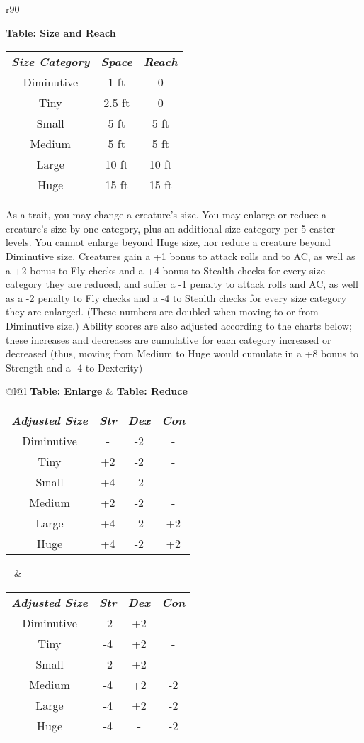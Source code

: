 	{\begin{wraptable}[9]{r}{90\unitlength}
		\raggedright\textbf{Table: Size and Reach}
		\small
		\begin{tabular}{@{}c@{~~~}c@{~~}c}
		\rowcolor{gray!50}
			\textbf{\textit{Size Category}} &\textbf{\textit{Space}}&\textbf{\textit{Reach}}\\
			Diminutive& 1 ft& 0\\
			Tiny &2.5 ft&0\\
			Small &5 ft&5 ft\\
			Medium &5 ft&5 ft\\
			Large &10 ft&10 ft\\
			Huge &15 ft&15 ft
		\end{tabular}
	\end{wraptable}
	As a trait, you may change a creature's size. You may enlarge or reduce a creature's size by one category, plus an additional size category per 5 caster levels. You cannot enlarge beyond Huge size, nor reduce a creature beyond Diminutive size. Creatures gain a +1 bonus to attack rolls and to AC, as well
	as a +2 bonus to Fly checks and a +4 bonus to Stealth checks for every size category they are reduced, and suffer a -1 penalty to attack rolls and AC, as well as a -2 penalty to Fly checks and a -4 to Stealth checks for every size category they are enlarged. (These numbers are doubled when moving to or from Diminutive size.) Ability scores are also adjusted according to the charts below; these increases and decreases are cumulative for each category increased or decreased (thus, moving from Medium to Huge would cumulate in a +8 bonus to Strength and	a -4 to Dexterity)\\
	\begin{tabular}{@{}l@{}l}
		\textbf{Table: Enlarge} & \textbf{Table: Reduce}\\
		\rowcolors{2}{gray!25}{white}
		\small\begin{tabular}{cccc}
			\rowcolor{gray!50}
			\textbf{\textit{Adjusted Size}} &\textbf{\textit{Str}}&\textbf{\textit{Dex}}&\textbf{\textit{Con}}\\
			Diminutive&-&-2&-\\
			Tiny &+2&-2&-\\
			Small &+4&-2&-\\
			Medium &+2&-2&-\\
			Large &+4&-2&+2\\
			Huge &+4&-2&+2
		\end{tabular}~ &
		\small\begin{tabular}{cccc}
			\rowcolor{gray!50}
			\textbf{\textit{Adjusted Size}} &\textbf{\textit{Str}}&\textbf{\textit{Dex}}&\textbf{\textit{Con}}\\
			Diminutive& -2& +2& -\\
			Tiny &-4&+2&-\\
			Small &-2&+2&-\\
			Medium &-4&+2&-2\\
			Large &-4&+2&-2\\
			Huge &-4&-&-2
		\end{tabular}
	\end{tabular}
}{}
